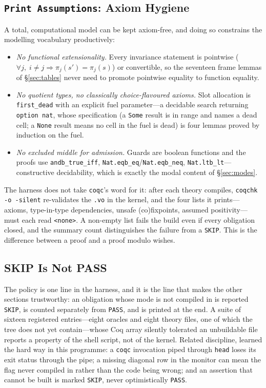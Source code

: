 \documentclass[10pt,journal,compsoc,twocolumn]{article}
\theoremstyle{definition}
\theoremstyle{remark}
\theoremstyle{plain}
\newcommand{\ctr}[1]{\texttt{#1}}
\begin{document}
\subsection{\texorpdfstring{\ctr{Print Assumptions}}{Print Assumptions}: Axiom Hygiene}
\label{sec:axioms}
A total, computational model can be kept axiom-free, and doing so constrains the modelling vocabulary productively:
\begin{itemize}[leftmargin=*]
    \item \emph{No functional extensionality.} Every invariance statement is pointwise (\(\forall j,\; i \ne j \Rightarrow \pi_j(s') = \pi_j(s)\)) or convertible, so the seventeen frame lemmas of \S\ref{sec:tables} never need to promote pointwise equality to function equality.
    \item \emph{No quotient types, no classically choice-flavoured axioms.} Slot allocation is \ctr{first\_dead} with an explicit fuel parameter---a decidable search returning \ctr{option nat}, whose specification (a \ctr{Some} result is in range and names a dead cell; a \ctr{None} result means no cell in the fuel is dead) is four lemmas proved by induction on the fuel.
    \item \emph{No excluded middle for admission.} Guards are boolean functions and the proofs use \ctr{andb\_true\_iff}, \ctr{Nat.eqb\_eq}/\ctr{Nat.eqb\_neq}, \ctr{Nat.ltb\_lt}---constructive decidability, which is exactly the modal content of \S\ref{sec:modes}.
\end{itemize}
The harness does not take \ctr{coqc}'s word for it: after each theory compiles, \ctr{coqchk -o -silent} re-validates the \ctr{.vo} in the kernel, and the four lists it prints---axioms, type-in-type dependencies, unsafe (co)fixpoints, assumed positivity---must each read \mbox{\ctr{<none>}}. A non-empty list fails the build even if every obligation closed, and the summary count distinguishes the failure from a \ctr{SKIP}. This is the difference between a proof and a proof modulo wishes.

\subsection{SKIP Is Not PASS}
The policy is one line in the harness, and it is the line that makes the other sections trustworthy: an obligation whose mode is not compiled in is reported \ctr{SKIP}, is counted separately from \ctr{PASS}, and is printed at the end. A suite of sixteen registered entries---eight oracles and eight theory files, one of which the tree does not yet contain---whose Coq array silently tolerated an unbuildable file reports a property of the shell script, not of the kernel. Related discipline, learned the hard way in this programme: a \ctr{coqc} invocation piped through \ctr{head} loses its exit status through the pipe; a missing diagonal row in the monitor can mean the flag never compiled in rather than the code being wrong; and an assertion that cannot be built is marked \ctr{SKIP}, never optimistically \ctr{PASS}.
\end{document}
